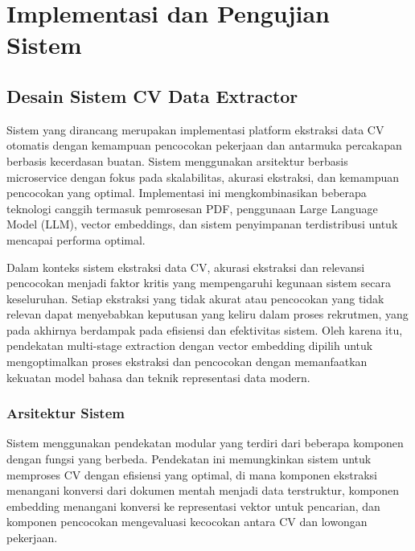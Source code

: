 \chapter{Implementasi dan Pengujian Sistem}

\section{Desain Sistem CV Data Extractor}
Sistem yang dirancang merupakan implementasi platform ekstraksi data CV otomatis dengan kemampuan pencocokan pekerjaan dan antarmuka percakapan berbasis kecerdasan buatan. Sistem menggunakan arsitektur berbasis microservice dengan fokus pada skalabilitas, akurasi ekstraksi, dan kemampuan pencocokan yang optimal. Implementasi ini mengkombinasikan beberapa teknologi canggih termasuk pemrosesan PDF, penggunaan Large Language Model (LLM), vector embeddings, dan sistem penyimpanan terdistribusi untuk mencapai performa optimal.

Dalam konteks sistem ekstraksi data CV, akurasi ekstraksi dan relevansi pencocokan menjadi faktor kritis yang mempengaruhi kegunaan sistem secara keseluruhan. Setiap ekstraksi yang tidak akurat atau pencocokan yang tidak relevan dapat menyebabkan keputusan yang keliru dalam proses rekrutmen, yang pada akhirnya berdampak pada efisiensi dan efektivitas sistem. Oleh karena itu, pendekatan multi-stage extraction dengan vector embedding dipilih untuk mengoptimalkan proses ekstraksi dan pencocokan dengan memanfaatkan kekuatan model bahasa dan teknik representasi data modern.

\subsection{Arsitektur Sistem}
Sistem menggunakan pendekatan modular yang terdiri dari beberapa komponen dengan fungsi yang berbeda. Pendekatan ini memungkinkan sistem untuk memproses CV dengan efisiensi yang optimal, di mana komponen ekstraksi menangani konversi dari dokumen mentah menjadi data terstruktur, komponen embedding menangani konversi ke representasi vektor untuk pencarian, dan komponen pencocokan mengevaluasi kecocokan antara CV dan lowongan pekerjaan.

